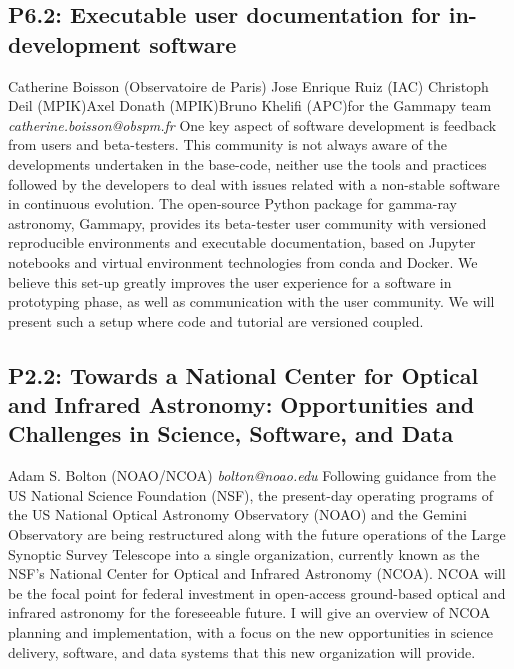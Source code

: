 \documentclass{report}
\begin{document}
\subsection*{P6.2: Executable user documentation for in-development software}
\bigskip
Catherine Boisson (Observatoire de Paris) \newline Jose Enrique Ruiz (IAC) \newline  Christoph Deil (MPIK)\newline  Axel Donath (MPIK)\newline Bruno Khelifi (APC)\newline  for the Gammapy team\newline\newline
{\it catherine.boisson@obspm.fr}\newline
\newline\newline
One key aspect of software development is feedback from users and beta-testers. This community is not always aware of the developments undertaken in the base-code, neither use the tools and practices followed by the developers to deal with issues related with a non-stable software in continuous evolution. The open-source Python package for gamma-ray astronomy, Gammapy, provides its beta-tester user community with versioned reproducible environments and executable documentation, based on Jupyter notebooks and virtual environment  technologies from conda and Docker. We believe this set-up greatly improves the user experience for a software in prototyping phase, as well as communication with the user community. We will present such a setup where code and tutorial are versioned coupled.\newline
\newpage
\subsection*{P2.2: Towards a National Center for Optical and Infrared Astronomy: Opportunities and Challenges in Science, Software, and Data}
\bigskip
Adam S. Bolton (NOAO/NCOA) \newline   \newline   \newline   \newline  \newline  \newline\newline
{\it bolton@noao.edu}\newline
\newline\newline
Following guidance from the US National Science Foundation (NSF), the present-day operating programs of the US National Optical Astronomy Observatory (NOAO) and the Gemini Observatory are being restructured along with the future operations of the Large Synoptic Survey Telescope into a single organization, currently known as the NSF’s National Center for Optical and Infrared Astronomy (NCOA). NCOA will be the focal point for federal investment in open-access ground-based optical and infrared astronomy for the foreseeable future. I will give an overview of NCOA planning and implementation, with a focus on the new opportunities in science delivery, software, and data systems that this new organization will provide.\newline
\newpage
\end{document}
